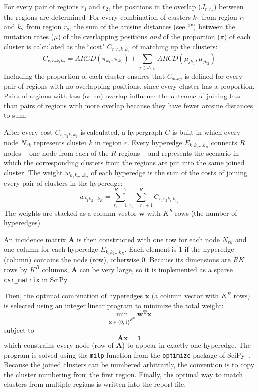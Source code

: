 \documentclass{article}
\begin{document}
For every pair of regions $r_1$ and $r_2$, the positions in the overlap ($J_{r_1r_2}$) between the regions are determined.
For every combination of clusters $k_1$ from region $r_1$ and $k_2$ from region $r_2$, the sum of the arcsine distances (see ``") between the mutation rates ($\mu$) of the overlapping positions \textit{and} of the proportion ($\pi$) of each cluster is calculated as the ``cost" $C_{r_1r_2k_1k_2}$ of matching up the clusters:
\begin{equation}
    C_{r_1r_2k_1k_2} = ARCD(\pi_{k_1},\pi_{k_2}) + \sum_{j \in J_{r_1r_2}}{ARCD(\mu_{jk_1},\mu_{jk_2})}
\end{equation}
Including the proportion of each cluster ensures that $C_{abxy}$ is defined for every pair of regions with no overlapping positions, since every cluster has a proportion.
Pairs of regions with less (or no) overlap influence the outcome of joining less than pairs of regions with more overlap because they have fewer arcsine distances to sum.

After every cost $C_{r_1r_2k_1k_2}$ is calculated, a hypergraph $G$ is built in which every node $N_{rk}$ represents cluster $k$ in region $r$.
Every hyperedge $E_{k_1k_2...k_R}$ connects $R$ nodes -- one node from each of the $R$ regions -- and represents the scenario in which the corresponding clusters from the regions are put into the same joined cluster.
The weight $w_{k_1k_2...k_R}$ of each hyperedge is the sum of the costs of joining every pair of clusters in the hyperedge:
\begin{equation}
    w_{k_1k_2...k_R} = \sum_{r_1=1}^{R-1}{\sum_{r_2=r_1+1}^R{C_{r_1r_2k_{r_1}k_{r_2}}}}
\end{equation}
The weights are stacked as a column vector $\mathbf{w}$ with $K^R$ rows (the number of hyperedges).

An incidence matrix $\mathbf{A}$ is then constructed with one row for each node $N_{rk}$ and one column for each hyperedge $E_{k_1k_2...k_R}$.
Each element is 1 if the hyperedge (column) contains the node (row), otherwise 0.
Because its dimensions are $RK$ rows by $K^R$ columns, $\mathbf{A}$ can be very large, so it is implemented as a sparse \verb|csr_matrix| in SciPy~\cite{Virtanen2020}.

Then, the optimal combination of hyperedges $\mathbf{x}$ (a column vector with $K^R$ rows) is selected using an integer linear program to minimize the total weight:
\begin{equation}
    \min_{\mathbf{x} \in \{0, 1\}^{K^R}}{\mathbf{w^Tx}}
\end{equation}
subject to
\begin{equation}
    \mathbf{Ax} = \mathbf{1}
\end{equation}
which constrains every node (row of $\mathbf{A}$) to appear in exactly one hyperedge.
The program is solved using the \verb|milp| function from the \verb|optimize| package of SciPy~\cite{Virtanen2020}.
Because the joined clusters can be numbered arbitrarily, the convention is to copy the cluster numbering from the first region.
Finally, the optimal way to match clusters from multiple regions is written into the report file.


\newpage
\begin{singlespace}
	
	
\end{singlespace}
\end{document}

